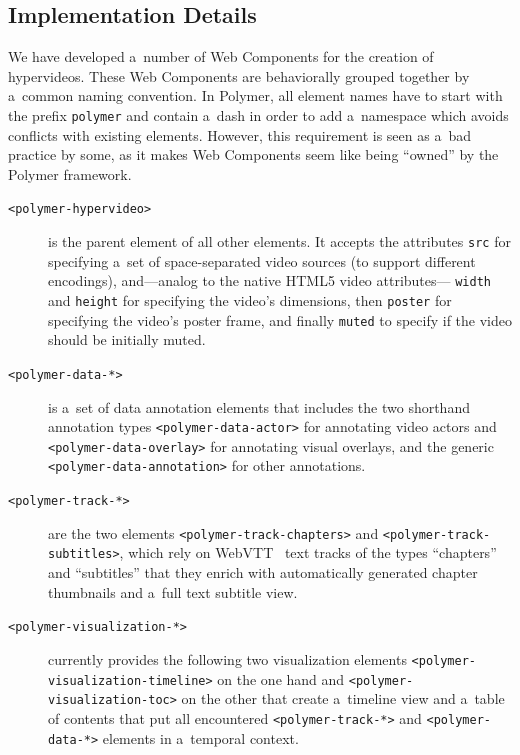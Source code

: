 \documentclass[runningheads,a4paper]{llncs}
\begin{document}
\subsection{Implementation Details}

We have developed a~number of Web Components for the creation of hypervideos.
These Web Components are behaviorally grouped together
by a~common naming convention.
In Polymer, all element names have to start with the prefix \texttt{polymer} and contain a~dash
in order to add a~namespace which avoids conflicts with existing elements.
However, this requirement is seen as a~bad practice by some,
as it makes Web Components seem like being ``owned'' by the Polymer framework.

\begin{description}
  \item[\texttt{<polymer-hypervideo>}] is the parent element of all other elements.
    It accepts the attributes \texttt{src} for specifying a~set of
    space-separated video sources (to support different encodings),
    and---analog to the native HTML5 video attributes---%
    \texttt{width} and \texttt{height} for specifying the video's dimensions,
    then \texttt{poster} for specifying the video's poster frame, and finally \texttt{muted} to specify if the video should be initially muted.
  \item[\texttt{<polymer-data-*>}] is a~set of data annotation elements
    that includes the two shorthand annotation types
    \texttt{<polymer-data-actor>} for annotating video actors and
    \texttt{<polymer-data-overlay>} for annotating visual overlays,
    and the generic \texttt{<polymer-data-annotation>} for other annotations.
  \item[\texttt{<polymer-track-*>}] are the two elements
    \texttt{<polymer-track-chapters>} and \texttt{<polymer-track-subtitles>},
    which rely on WebVTT~\cite{pfeiffer2013webvtt} text tracks
    of the types ``chapters'' and ``subtitles'' that they enrich with
    automatically generated chapter thumbnails and a~full text subtitle view.
  \item[\texttt{<polymer-visualization-*>}] currently provides the
    following two visualization elements
    \texttt{<polymer-visualization-timeline>} on the one hand and 
    \texttt{<polymer-visualization-toc>} on the other
    that create a~timeline view and a~table of contents
    that put all encountered \texttt{<polymer-track-*>}
    and \texttt{<polymer-data-*>} elements in a~temporal context.
\end{description}
\end{document}
